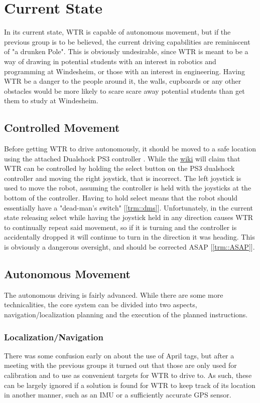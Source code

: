 \section{Current State}
In its current state, WTR is capable of autonomous movement, but if the previous group is to be believed, the current driving capabilities are reminiscent of "a drunken Pole".
This is obviously undesirable, since WTR is meant to be a way of drawing in potential students with an interest in robotics and programming at Windesheim, or those with an interest in engineering.
Having WTR be a danger to the people around it, the walls, cupboards or any other obstacles would be more likely to scare scare away potential students than get them to study at Windesheim.

\subsection{Controlled Movement}
Before getting WTR to drive autonomously, it should be moved to a safe location using the attached Dualshock PS3 controller \cite{dualshock}.
While the \href{https://windesheim-willy.github.io/WillyWiki/components/joystick.html}{wiki} will claim that WTR can be controlled by holding the select button on the PS3 dualshock controller and moving the right joystick, that is incorrect.
The left joystick is used to move the robot, assuming the controller is held with the joysticks at the bottom of the controller.
Having to hold select means that the robot should essentially have a "dead-man's switch" [\ref{trm::dms}].
Unfortunately, in the current state releasing select while having the joystick held in any direction causes WTR to continually repeat said movement, so if it is turning and the controller is accidentally dropped it will continue to turn in the direction it was heading.
This is obviously a dangerous oversight, and should be corrected ASAP [\ref{trm::ASAP}].

\subsection{Autonomous Movement}
The autonomous driving is fairly advanced.
While there are some more technicalities, the core system can be divided into two aspects, navigation/localization planning and the execution of the planned instructions.

\subsubsection{Localization/Navigation}
There was some confusion early on about the use of April tags, but after a meeting with the previous groups it turned out that those are only used for calibration and to use as convenient targets for WTR to drive to.
As such, these can be largely ignored if a solution is found for WTR to keep track of its location in another manner, such as an IMU or a sufficiently accurate GPS sensor.

